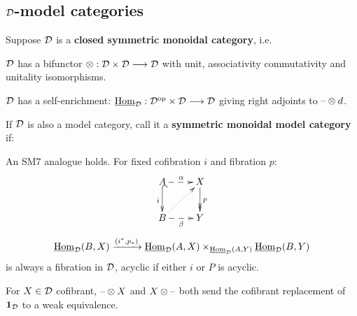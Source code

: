 \begin{MichaelStableModelCats}
\subsection*{$\mathcal{D}$-model categories}
\begin{itemise}
\item Suppose $\mathcal{D}$ is a \textbf{closed symmetric monoidal category}, i.e.
\begin{itemise}
\item $\mathcal{D}$ has a bifunctor $\otimes:\mathcal{D}\times\mathcal{D}\longrightarrow\mathcal{D}$ with unit, associativity commutativity and unitality isomorphisms.
\item $\mathcal{D}$ has a self-enrichment: $\operatorname{\underline{Hom}}_{\mathcal{D}}:\mathcal{D}^{\textup{op}}\times\mathcal{D}\longrightarrow\mathcal{D}$ giving right adjoints to $\textup{--}\otimes d$.
\end{itemise}
\item If $\mathcal{D}$ is also a model category, call it a \textbf{symmetric monoidal model category} if:
\begin{itemise}
\item An SM7 analogue holds. For fixed cofibration $i$ and fibration $p$:
\[\xymatrix{
A\ar@{-->}[r]^\alpha\ar@{^{(}->}[d]_i&X\ar@{->>}[d]^p\\
B\ar@{-->}[r]_\beta\ar@{..>}[ur]&Y
}\]
 \[\operatorname{\underline{Hom}}_{\mathcal{D}}(B,X)\xrightarrow{(i^*,p_*)}\operatorname{\underline{Hom}}_{\mathcal{D}}(A,X)\times_{\operatorname{\underline{Hom}}_{\mathcal{D}}(A,Y)}\operatorname{\underline{Hom}}_{\mathcal{D}}(B,Y)\]
is always a fibration in $\mathcal{D}$, acyclic if either $i$ or $P$ is acyclic. %
\item 
For $X\in\mathcal{D}$ cofibrant, $\textup{--}\otimes X$ and $X\otimes \textup{--}$ both send the cofibrant replacement of $\textbf{1}_{\mathcal{D}}$ to a weak equivalence.


\end{itemise}
\end{itemise}
\end{MichaelStableModelCats}

